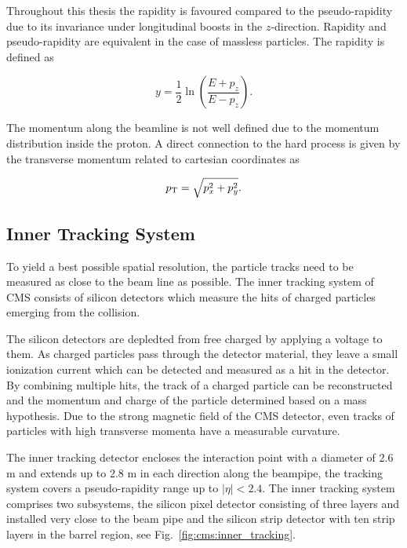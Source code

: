Throughout this thesis the rapidity is favoured compared to the pseudo-rapidity
due to its invariance under longitudinal boosts in the $z$-direction. Rapidity
and pseudo-rapidity are equivalent in the case of massless particles. The
rapidity is defined as

\begin{equation*}
    y = \frac{1}{2} \ln \left( \frac{E + p_z}{E - p_z} \right).
\end{equation*}

The momentum along the beamline is not well defined due to the momentum
distribution inside the proton. A direct connection to the hard process is given
by the transverse momentum \pt related to cartesian coordinates as

\begin{equation*}
    p_{\mathrm{T}} = \sqrt{p_x^2 + p_y^2}.
\end{equation*}

\subsection{Inner Tracking System}

To yield a best possible spatial resolution, the particle tracks need to be
measured as close to the beam line as possible. The inner tracking system of CMS
consists of silicon detectors which measure the hits of charged
particles emerging from the collision. 

The silicon detectors are depledted from free charged by applying a voltage to
them. As charged particles pass through the detector material, they leave a
small ionization current which can be detected and measured as a hit in the
detector. By combining multiple hits, the track of a charged particle can be
reconstructed and the momentum and charge of the particle determined based on a
mass hypothesis. Due to the strong magnetic field of the CMS detector, even
tracks of particles with high transverse momenta have a measurable curvature.
 
The inner tracking detector encloses the interaction point with a diameter of 2.6 m and
extends up to 2.8 m in each direction along the beampipe, the tracking system covers a
pseudo-rapidity range up to $|\eta| < 2.4$. The inner tracking system comprises
two subsystems, the silicon pixel detector consisting of three layers and
installed very close to the beam pipe and the silicon strip detector with ten
strip layers in the barrel region, see Fig.~\ref{fig:cms:inner_tracking}. 

